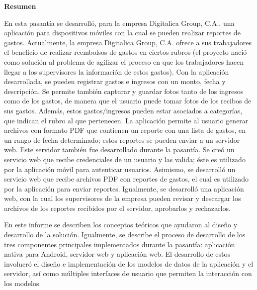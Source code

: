 \setcounter{page}{3}
\begin{center}
	{\bf Resumen}  %
\end{center}	

En esta pasantía se desarrolló, para la empresa Digitalica Group, C.A., una aplicación para dispositivos móviles con la cual se pueden realizar reportes de gastos. Actualmente, la empresa Digitalica Group, C.A. ofrece a sus trabajadores el beneficio de realizar reembolsos de gastos en ciertos rubros (el proyecto nació como solución al problema de agilizar el proceso en que los trabajadores hacen llegar a los supervisores la información de estos gastos). Con la aplicación desarrollada, se pueden registrar gastos e ingresos con un monto, fecha y descripción. Se permite también capturar y guardar fotos tanto de los ingresos como de los gastos, de manera que el usuario puede tomar fotos de los recibos de sus gastos. Además, estos gastos/ingresos pueden estar asociados a categorías, que indican el rubro al que pertenecen. La aplicación permite al usuario generar archivos con formato PDF que contienen un reporte con una lista de gastos, en un rango de fecha determinado; estos reportes se pueden enviar a un servidor web. Este servidor también fue desarrollado durante la pasantía. Se creó un servicio web que recibe credenciales de un usuario y las valida; éste es utilizado por la aplicación móvil para autenticar usuarios. Asimismo, se desarrolló un servicio web que recibe archivos PDF con reportes de gastos, el cual es utilizado por la aplicación para enviar reportes. Igualmente, se desarrolló una aplicación web, con la cual los supervisores de la empresa pueden revisar y descargar los archivos de los reportes recibidos por el servidor, aprobarlos y rechazarlos.

En este informe se describen los conceptos teóricos que ayudaron al diseño y desarrollo de la solución. Igualmente, se describe el proceso de desarrollo de los tres componentes principales implementados durante la pasantía: aplicación nativa para Android, servidor web y aplicación web. El desarrollo de estos involucró el diseño e implementación de los modelos de datos de la aplicación y el servidor, así como múltiples interfaces de usuario que permiten la interacción con los modelos. 



